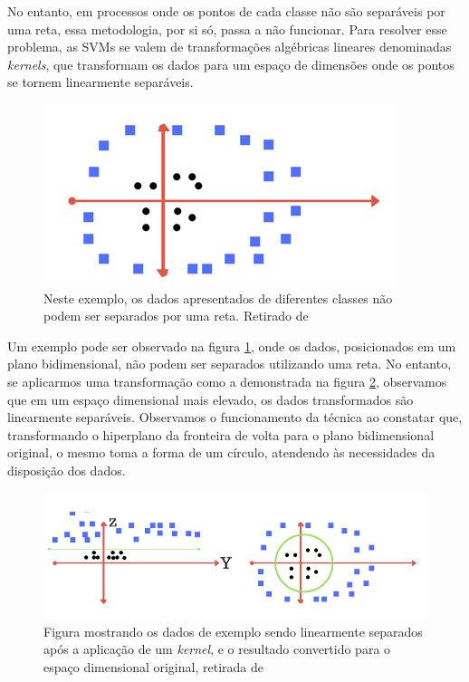 \documentclass[]{politex}
\begin{document}
No entanto, em processos onde os pontos de cada classe não são separáveis por uma reta, essa metodologia, por si só, passa a não funcionar. Para resolver esse problema, as SVMs se valem de transformações algébricas lineares denominadas \textit{kernels}, que transformam os dados para um espaço de dimensões onde os pontos se tornem linearmente separáveis.

\begin{figure}[ht]
  \centering
  \includegraphics[scale=0.6]{img/svmnaolinear.png}
  \caption{Neste exemplo, os dados apresentados de diferentes classes não podem ser separados por uma reta. Retirado de \citeyear{svmimagens} \citeauthor{svmimagens}}
  \label{fig:svmnaolinear}
\end{figure}

Um exemplo pode ser observado na figura \ref{fig:svmnaolinear}, onde os dados, posicionados em um plano bidimensional, não podem ser separados utilizando uma reta. No entanto, se aplicarmos uma transformação como a demonstrada na figura \ref{fig:svmkernel}, observamos que em um espaço dimensional mais elevado, os dados transformados são linearmente separáveis. Observamos o funcionamento da técnica ao constatar que, transformando o hiperplano da fronteira de volta para o plano bidimensional original, o mesmo toma a forma de um círculo, atendendo às necessidades da disposição dos dados.

\begin{figure}[ht]
  \centering
  \includegraphics[scale=0.6]{img/svmkernel.jpg}
  \caption{Figura mostrando os dados de exemplo sendo linearmente separados após a aplicação de um \textit{kernel}, e o resultado convertido para o espaço dimensional original, retirada de \citeyear{svmimagens} \citeauthor{svmimagens}}
  \label{fig:svmkernel}
\end{figure}
\end{document}

